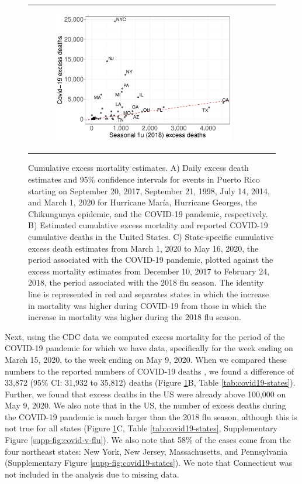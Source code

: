 \documentclass[11pt]{article}
\begin{document}
\begin{figure}[ht]
\begin{tabular}{lll}
\begin{subfigure}[t]{0.3\linewidth}
		\includegraphics[width=1\linewidth]{figs/figure-2c.pdf}
	\end{subfigure}\\
	\end{tabular}
    \caption{Cumulative excess mortality estimates. A) Daily excess death estimates and 95\% confidence intervals for events in Puerto Rico starting on September 20, 2017, September 21, 1998, July 14, 2014, and March 1, 2020 for Hurricane Mar\'ia, Hurricane Georges, the Chikungunya epidemic, and the COVID-19 pandemic, respectively.  B) Estimated cumulative excess mortality and reported COVID-19 cumulative deaths in the United States. C) State-specific cumulative excess death estimates from March 1, 2020 to May 16, 2020, the period associated with the COVID-19 pandemic, plotted against the excess mortality estimates from December 10, 2017 to February 24, 2018, the period associated with the 2018 flu season. The identity line is represented in red and separates states in which the increase in mortality was higher during COVID-19 from those in which the increase in mortality was higher during the 2018 flu season.}
    \label{fig:excess-deaths}
\end{figure}

Next, using the CDC data we computed excess mortality for the period of the COVID-19 pandemic for which we have data, specifically for the week ending on March 15, 2020, to the week ending on May 9, 2020. When we compared these numbers to the reported numbers of COVID-19 deaths \cite{smith2020coronavirus}, we found a difference of 33,872 (95\% CI: 31,932 to 35,812) deaths (Figure \ref{fig:excess-deaths}B, Table \ref{tab:covid19-states}). Further, we found that excess deaths in the US were already above 100,000 on May 9, 2020. We also note that in the US, the number of excess deaths during the COVID-19 pandemic is much larger than the 2018 flu season, although this is not true for all states (Figure \ref{fig:excess-deaths}C, Table \ref{tab:covid19-states}, Supplementary Figure \ref{supp-fig:covid-v-flu}). We also note that 58\% of the cases come from the four northeast states: New York, New Jersey, Massachusetts, and Pennsylvania (Supplementary Figure \ref{supp-fig:covid19-states}). We note that Connecticut was not included in the analysis due to missing data.
\end{document}
